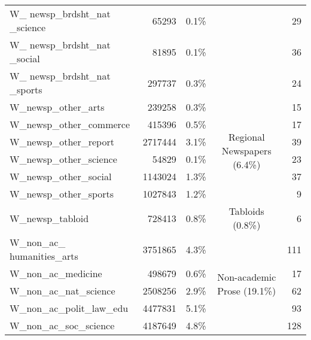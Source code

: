 \begin{table}[Ht]
\begin{tabular}{lrrcr}
        W\_ newsp\_brdsht\_nat \_science   & 65293    & 0.1\%   &                                                         & 29    \\
        W\_ newsp\_brdsht\_nat \_social    & 81895    & 0.1\%   &                                                         & 36    \\
        W\_ newsp\_brdsht\_nat \_sports    & 297737   & 0.3\%   &                                                         & 24    \\ \cline{4-4}
        W\_newsp\_other\_arts              & 239258   & 0.3\%   & \multirow{6}{*}{\parbox{2.1cm}{Regional Newspapers (6.4\%)}}    & 15    \\
        W\_newsp\_other\_commerce          & 415396   & 0.5\%   &                                                         & 17    \\
        W\_newsp\_other\_report            & 2717444  & 3.1\%   &                                                         & 39    \\
        W\_newsp\_other\_science           & 54829    & 0.1\%   &                                                         & 23    \\
        W\_newsp\_other\_social            & 1143024  & 1.3\%   &                                                         & 37    \\
        W\_newsp\_other\_sports            & 1027843  & 1.2\%   &                                                         & 9     \\ \cline{4-4}
        W\_newsp\_tabloid                  & 728413   & 0.8\%   & Tabloids (0.8\%)                                        & 6     \\ \cline{4-4}
        W\_non\_ac\_ humanities\_arts      & 3751865  & 4.3\%   & \multirow{6}{*}{\parbox{2.1cm}{Non-academic Prose (19.1\%)}}            & 111   \\
        W\_non\_ac\_medicine               & 498679   & 0.6\%   &                                                         & 17    \\
        W\_non\_ac\_nat\_science           & 2508256  & 2.9\%   &                                                         & 62    \\
        W\_non\_ac\_polit\_law\_edu        & 4477831  & 5.1\%   &                                                         & 93    \\
        W\_non\_ac\_soc\_science           & 4187649  & 4.8\%   &                                                         & 128   \\

\end{tabular}
\end{table}
